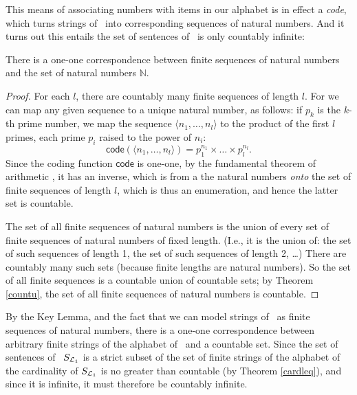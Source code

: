 This means of associating numbers with items in our alphabet is in effect a \emph{code}, which turns strings of \lone\ into corresponding sequences of natural numbers. And it turns out this entails the set of sentences of \lone\ is only countably infinite:
 \begin{lemma}
	There is a one-one correspondence between finite sequences of natural numbers and the set of natural numbers $\mathbb{N}$.
	\begin{proof}
		For each $l$, there are countably many finite sequences of length $l$. For we can map any given sequence to a unique natural number, as follows: if $p_{k}$ is the $k$-th prime number, we map the sequence  $\langle n_{1}, \ldots, n_{l}\rangle$ to the product of the first $l$ primes, each prime $p_{i}$ raised to the power of $n_{i}$: $$\mathsf{code}(\langle n_{1}, \ldots, n_{l}\rangle) = p_{1}^{n_{1}}\times\ldots\times p_{l}^{n_{l}}.$$ Since the coding function $\mathsf{code}$ is one-one, by the fundamental theorem of arithmetic \citep[§V.14]{fundta}, it has an inverse, which is from a the natural numbers \emph{onto} the set of finite sequences of length $l$, which is thus an enumeration, and hence the latter set is countable.
		
		The set of all finite sequences of natural numbers is the union of every set of finite sequences of natural numbers of fixed length. (I.e., it is the union of: the set of such sequences of length 1, the set of such sequences of length 2, …) There are countably many such sets (because finite lengths are natural numbers). So the set of all finite sequences is a countable union of countable sets; by Theorem \ref{countu}, the set of all finite sequences of natural numbers is countable. 
	\end{proof}
\end{lemma}  
By the Key Lemma, and the fact that we can model strings of \lone\ as finite sequences of natural numbers, there is a one-one correspondence between arbitrary  finite strings of the alphabet of \lone\ and a countable set. Since the set of sentences of \lone\ $S_{\mathcal{L}_{1}}$ is a strict subset of the set of finite strings of the alphabet of \lone\, the cardinality of $S_{\mathcal{L}_{1}}$ is no greater than countable (by Theorem \ref{cardleq}), and since it is infinite, it must therefore be countably infinite. 

